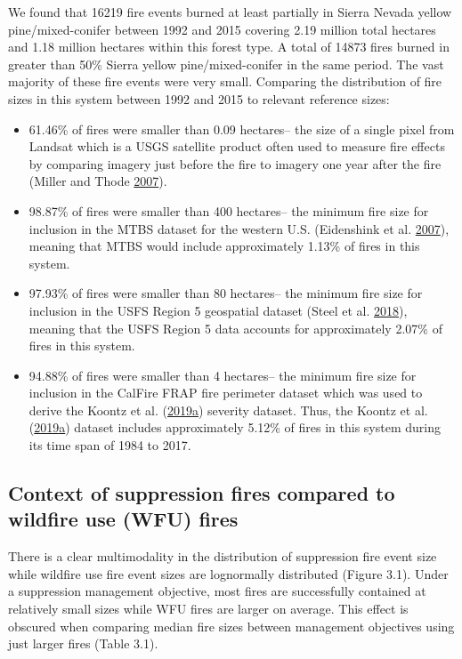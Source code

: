 \documentclass[twoside,12pt,final]{ucthesis-CA2012}
\providecommand{\tightlist}{%
  \setlength{\itemsep}{0pt}\setlength{\parskip}{0pt}}
\begin{document}
\begin{ucmainmatter}
We found that 16219 fire events burned at least partially in Sierra
Nevada yellow pine/mixed-conifer between 1992 and 2015 covering 2.19
million total hectares and 1.18 million hectares within this forest
type. A total of 14873 fires burned in greater than 50\% Sierra yellow
pine/mixed-conifer in the same period. The vast majority of these fire
events were very small. Comparing the distribution of fire sizes in this
system between 1992 and 2015 to relevant reference sizes:
\begin{itemize}
\tightlist
\item
  61.46\% of fires were smaller than 0.09 hectares-- the size of a
  single pixel from Landsat which is a USGS satellite product often used
  to measure fire effects by comparing imagery just before the fire to
  imagery one year after the fire (Miller and Thode
  \protect\hyperlink{ref-miller2007}{2007}).
\item
  98.87\% of fires were smaller than 400 hectares-- the minimum fire
  size for inclusion in the MTBS dataset for the western U.S.
  (Eidenshink et al. \protect\hyperlink{ref-eidenshink2007}{2007}),
  meaning that MTBS would include approximately 1.13\% of fires in this
  system.
\item
  97.93\% of fires were smaller than 80 hectares-- the minimum fire size
  for inclusion in the USFS Region 5 geospatial dataset (Steel et al.
  \protect\hyperlink{ref-steel2018}{2018}), meaning that the USFS Region
  5 data accounts for approximately 2.07\% of fires in this system.
\item
  94.88\% of fires were smaller than 4 hectares-- the minimum fire size
  for inclusion in the CalFire FRAP fire perimeter dataset which was
  used to derive the Koontz et al.
  (\protect\hyperlink{ref-koontz2019}{2019}\protect\hyperlink{ref-koontz2019}{a})
  severity dataset. Thus, the Koontz et al.
  (\protect\hyperlink{ref-koontz2019}{2019}\protect\hyperlink{ref-koontz2019}{a})
  dataset includes approximately 5.12\% of fires in this system during
  its time span of 1984 to 2017.
\end{itemize}
\subsection{Context of suppression fires compared to wildfire use (WFU)
fires}\label{context-of-suppression-fires-compared-to-wildfire-use-wfu-fires}

There is a clear multimodality in the distribution of suppression fire
event size while wildfire use fire event sizes are lognormally
distributed (Figure 3.1). Under a suppression management objective, most
fires are successfully contained at relatively small sizes while WFU
fires are larger on average. This effect is obscured when comparing
median fire sizes between management objectives using just larger fires
(Table 3.1).


\end{ucmainmatter}
\end{document}
